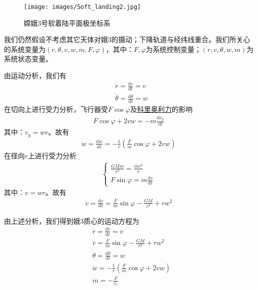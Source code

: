             \begin{figure}[H]
            \centering
            \texttt{[image: images/Soft\_landing2.jpg]}
            \caption{嫦娥3号软着陆平面极坐标系}
            \label{fig:嫦娥3号软着陆平面极坐标系}
            \end{figure}
            \par
            我们仍然假设不考虑其它天体对娥3的摄动；下降轨道与经纬线重合。我们所关心的系统变量为$(r,\theta,v,w,m,F,\varphi)$，其中：$F,\varphi$为系统控制变量；$(r,v,\theta,w,m)$为系统状态变量。
            \par
            由运动分析，我们有
            \begin{align*}
            & \dot{r} = \frac{\mathrm{d}r}{\mathrm{d}t} = v\\
            & \dot{\theta} = \frac{\mathrm{d}\theta}{\mathrm{d}t} = w
            \end{align*}
            在切向上进行受力分析，飞行器受$F\cos\varphi$及\underline{科里奥利力}的影响
            \begin{align*}
            F\cos\varphi + 2vw = -m\frac{\mathrm{d}v_y}{\mathrm{d}t}
            \end{align*}
            其中：$v_y = wr$。故有
            \begin{align*}
            \dot{w} = \frac{\mathrm{d}w}{\mathrm{d}t} = -\frac{1}{r} (\frac{F}{m} \cos\varphi+2vw)
            \end{align*}
            在径向$r$上进行受力分析
            \begin{align*}
            \left\{
            \begin{aligned}
            \frac{GMm}{r^2} = \frac{mv^2}{r}\\
            F\sin \varphi = m\frac{\mathrm{d}v}{\mathrm{d}t}
            \end{aligned}
            \right.
            \end{align*}
            其中：$v= wr$。故有
            \begin{align*}
            \dot{v} = \frac{\mathrm{d}v}{\mathrm{d}t} = \frac{F}{m}\sin \varphi - \frac{GM}{r^2}+rw^2
            \end{align*}
            \par
            由上述分析，我们得到娥3质心的运动方程为
            \begin{align*}
            & \dot{r} = \frac{\mathrm{d}r}{\mathrm{d}t} = v\\
            & \dot{v} = \frac{F}{m}\sin\varphi - \frac{GM}{r^2}+rw^2\\
            & \dot{\theta} = \frac{\mathrm{d}\theta}{\mathrm{d}t} = w\\
            & \dot{w} = -\frac{1}{r}(\frac{F}{m}\cos\varphi+2vw)\\
            & \dot{m} = -\frac{F}{v_e}
            \end{align*}
